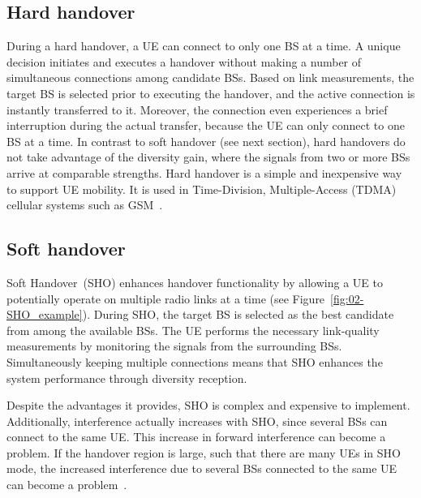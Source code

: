 \subsection{Hard handover}

During a hard handover, a UE can connect to only one BS at a time.
A unique decision initiates and executes a handover without making
a number of simultaneous connections among candidate BSs. Based on
link measurements, the target BS is selected prior to executing the
handover, and the active connection is instantly transferred to it.
Moreover, the connection even experiences a brief interruption during
the actual transfer, because the UE can only connect to one BS at
a time. In contrast to soft handover (see next section), hard handovers
do not take advantage of the diversity gain, where the signals from
two or more BSs arrive at comparable strengths. Hard handover is a
simple and inexpensive way to support UE mobility. It is used in Time-Division,
Multiple-Access (TDMA)
cellular systems such as GSM~\cite{Stuber-Principles_of_mobile_communication:2011}.


\subsection{Soft handover}

Soft Handover~(SHO) enhances
handover functionality by allowing a UE to potentially operate on
multiple radio links at a time (see Figure~\ref{fig:02-SHO_example}).
During SHO, the target BS is selected as the best candidate from among
the available BSs. The UE performs the necessary link-quality measurements
by monitoring the signals from the surrounding BSs. Simultaneously
keeping multiple connections means that SHO enhances the system performance
through diversity reception.

Despite the advantages it provides, SHO is complex and expensive to
implement. Additionally, interference actually increases with SHO,
since several BSs can connect to the same UE. This increase in forward
interference can become a problem. If the handover region is large,
such that there are many UEs in SHO mode, the increased interference
due to several BSs connected to the same UE can become a problem~\cite{Stuber-Principles_of_mobile_communication:2011}.

